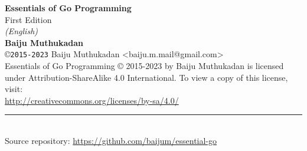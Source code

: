\newpage
{}

{\sf\bfseries Essentials of Go Programming }\\
{\sf First Edition}\\
\textit{(English)}\\[3mm]
{\sf\bfseries Baiju Muthukadan}\\[.1in]
{\small \copyright}{\small \tt 2015-2023} {\small Baiju Muthukadan <baiju.m.mail@gmail.com>}\\

Essentials of Go Programming {\small \copyright} 2015-2023 by Baiju Muthukadan is licensed
under Attribution-ShareAlike 4.0 International. To view a copy of this license,
visit:\\
\url{http://creativecommons.org/licenses/by-sa/4.0/}

\rule{200pt}{0.4pt}\\[3mm]

Source repository: \url{https://github.com/baijum/essential-go}
